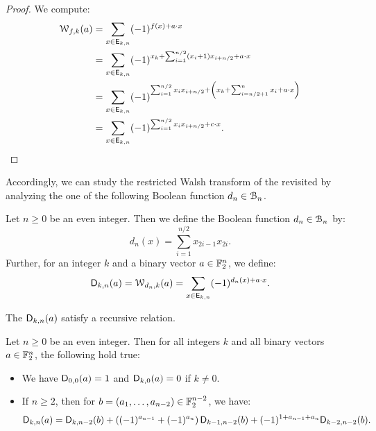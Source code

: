 \documentclass{llncs}
\begin{document}
\begin{proof}
	We compute:
	\begin{align*}
		\wtk{f}{k}(a)&=\sum_{x \in \Ekn{k}{n}} (-1)^{f(x)+a \cdot x}\\
		&=\sum_{x \in \Ekn{k}{n}} (-1)^{x_k + \sum_{i=1}^{n/2} (x_i+1) x_{i+n/2}+ a \cdot x}\\
		&=\sum_{x \in \Ekn{k}{n}} (-1)^{\sum_{i=1}^{n/2} x_i x_{i+n/2}+\left(x_k+\sum_{i=n/2+1}^{n}x_i+a\cdot x\right)}\\
		&=\sum_{x \in \Ekn{k}{n}} (-1)^{\sum_{i=1}^{n/2} x_i x_{i+n/2}+ c \cdot x}.\qedhere
	\end{align*}
\end{proof}

Accordingly, we can study the restricted Walsh transform of the revisited \hwbf{} by analyzing the one of the following Boolean function $d_n\in\BN$.

\begin{definition}
	Let $n\geq 0$ be an even integer. Then we define the Boolean function $d_n\in\BN$ by:
	\[
		d_n(x)=\sum_{i=1}^{n/2}x_{2i-1}x_{2i}.
	\]
	Further, for an integer $k$ and a binary vector $a\in\F_2^n$, we define:
	\[
		\Dnka{n}{k}{a}=\wtk{d_n}{k}(a)=\sum_{x\in \Ekn{k}{n}} (-1)^{d_n(x) +a\cdot x}.
	\]
\end{definition}

The $\Dnka{n}{k}{a}$ satisfy a recursive relation.

\begin{proposition}\label{prop:recursiveDnka}
Let $n\geq 0$ be an even integer. Then for all integers $k$ and all binary vectors $a\in\F_2^n$, the following hold true:
	\begin{itemize}
		\item We have $\Dnka 00a=1$ and $\Dnka 0ka=0$ if $k\neq 0$.
		\item If $n\geq 2$, then for $b=(a_1,\dots,a_{n-2})\in\F_2^{n-2}$, we have:
		\[
			\Dnka{n}{k}{a}=\Dnka{n-2}{k}{b}+\left((-1)^{a_{n-1}} + (-1)^{a_{n}}\right)\Dnka{n-2}{k-1}{b} + (-1)^{1+a_{n-1}+a_n} \Dnka{n-2}{k-2}{b}.
		\]
	\end{itemize}
\end{proposition}
\end{document}
